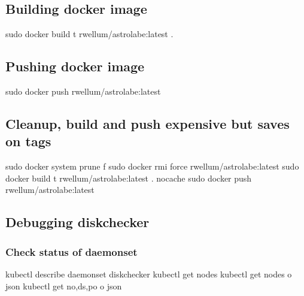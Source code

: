 \documentclass[letterpaper,10pt,english]{sphinxmanual}
\begin{document}
\subsection{Building docker image}
\label{\detokenize{README:building-docker-image}}
\begin{sphinxVerbatim}[commandchars=\\\{\}]
sudo docker build \PYGZhy{}t rwellum/astrolabe:latest .
\end{sphinxVerbatim}


\subsection{Pushing docker image}
\label{\detokenize{README:pushing-docker-image}}
\begin{sphinxVerbatim}[commandchars=\\\{\}]
sudo docker push rwellum/astrolabe:latest
\end{sphinxVerbatim}


\subsection{Cleanup, build and push \sphinxhyphen{} expensive but saves on tags}
\label{\detokenize{README:cleanup-build-and-push-expensive-but-saves-on-tags}}
\begin{sphinxVerbatim}[commandchars=\\\{\}]
sudo docker system prune \PYGZhy{}f
sudo docker rmi \PYGZhy{}\PYGZhy{}force rwellum/astrolabe:latest
sudo docker build \PYGZhy{}t rwellum/astrolabe:latest . \PYGZhy{}\PYGZhy{}no\PYGZhy{}cache
sudo docker push rwellum/astrolabe:latest
\end{sphinxVerbatim}


\subsection{Debugging disk\sphinxhyphen{}checker}
\label{\detokenize{README:debugging-disk-checker}}

\subsubsection{Check status of daemonset}
\label{\detokenize{README:check-status-of-daemonset}}
\begin{sphinxVerbatim}[commandchars=\\\{\}]
kubectl describe daemonset disk\PYGZhy{}checker
kubectl get nodes
kubectl get nodes \PYGZhy{}o json
kubectl get no,ds,po \PYGZhy{}o json
\end{sphinxVerbatim}
\end{document}
